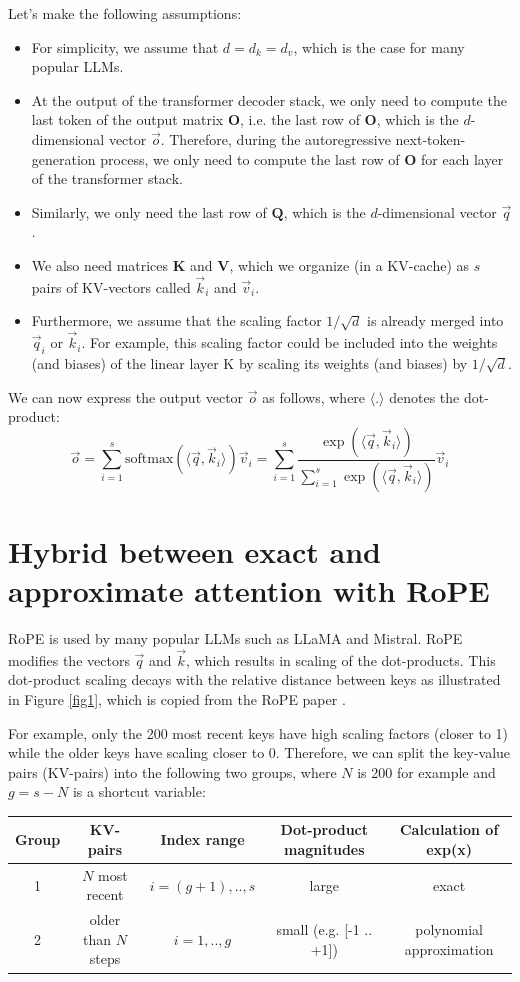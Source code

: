\documentclass{article}
\numberwithin{equation}{section} %
\newcommand{\mat}[1]{\mathbf{#1}}          %
\newcommand{\dpro}[1]{\langle #1 \rangle}  %
\def\Q{\mat{Q}}
\def\K{\mat{K}}
\def\V{\mat{V}}
\def\O{\mat{O}}
\def\q{\vec{q}}
\def\k{\vec{k}}
\def\v{\vec{v}}
\def\o{\vec{o}}
\def\dotqk{\dpro{\q, \k_i}}  %
\def\edotqk{\exp(\dotqk)}    %
\begin{document}
Let’s make the following assumptions:
\begin{itemize}[topsep=-1pt, itemsep=-1pt]
  \item For simplicity, we assume that $d = d_k = d_v$, which is the case for many popular LLMs.
  \item At the output of the transformer decoder stack, we only need to compute the last token of the output matrix $\O$, i.e. the last row of $\O$, which is the $d$-dimensional vector $\o$. Therefore, during the autoregressive next-token-generation process, we only need to compute the last row of $\O$ for each layer of the transformer stack.
  \item Similarly, we only need the last row of $\Q$, which is the $d$-dimensional vector $\q$.
  \item We also need matrices $\K$ and $\V$, which we organize (in a KV-cache) as $s$ pairs of KV-vectors called $\k_i$ and $\v_i$.
  \item Furthermore, we assume that the scaling factor $1/\sqrt{d}$ is already merged into $\q_i$ or $\k_i$. For example, this scaling factor could be included into the weights (and biases) of the linear layer K by scaling its weights (and biases) by $1/\sqrt{d}$.
\end{itemize}

We can now express the output vector $\o$ as follows, where $\dpro{.}$ denotes the dot-product:
\begin{equation}
  \o = \sum_{i = 1}^s \text{softmax}(\dotqk) \v_i
     = \sum_{i = 1}^s \frac{\edotqk}{\sum_{i = 1}^s \edotqk} \v_i
\label{eq1.2} \end{equation}

\section{Hybrid between exact and approximate attention with RoPE}
RoPE is used by many popular LLMs such as LLaMA and Mistral. RoPE modifies the vectors $\q$ and $\k$, which results in scaling of the dot-products. This dot-product scaling decays with the relative distance between keys as illustrated in Figure \ref{fig1}, which is copied from the RoPE paper \citep{RoPE}.

For example, only the 200 most recent keys have high scaling factors (closer to 1) while the older keys have scaling closer to 0. Therefore, we can split the key-value pairs (KV-pairs) into the following two groups, where $N$ is 200 for example and $g = s - N$ is a shortcut variable:
\begingroup \renewcommand{\arraystretch}{1.3} %
\begin{center} \begin{tabular}{c|c|c|c|c}
  \textbf{Group} & \textbf{KV-pairs} & \textbf{Index range} & \textbf{Dot-product magnitudes} & \textbf{Calculation of exp(x)} \\ \hline
  1 & $N$ most recent      & $i = (g + 1), .., s$ & large                   & exact                    \\ \hline
  2 & older than $N$ steps & $i = 1, .., g$       & small (e.g. [-1 .. +1]) & polynomial approximation
\end{tabular} \end{center} \endgroup
\end{document}
